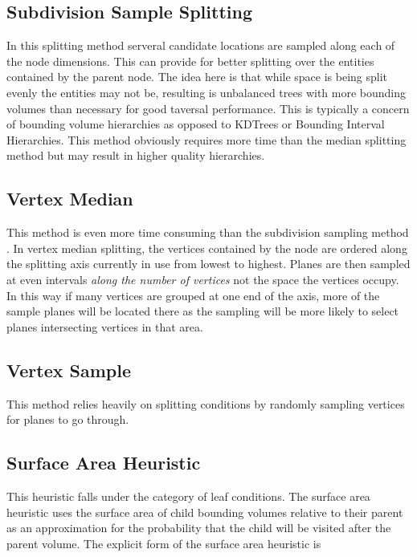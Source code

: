 \documentclass[10pt, a4paper]{article}
\begin{document}
\subsection{Subdivision Sample Splitting}%

In this splitting method serveral candidate locations are sampled along each of the node dimensions. This can provide for better splitting over the entities contained by the parent node. The idea here is that while space is being split evenly the entities may not be, resulting is unbalanced trees with more bounding volumes than necessary for good taversal performance. This is typically a concern of bounding volume hierarchies as opposed to KDTrees or Bounding Interval Hierarchies. This method obviously requires more time than the median splitting method but may result in higher quality hierarchies.

\subsection{Vertex Median}%

This method is even more time consuming than the subdivision sampling method . In vertex median splitting, the vertices contained by the node are ordered along the splitting axis currently in use from lowest to highest. Planes are then sampled at even intervals \textit{along the number of vertices} not the space the vertices occupy. In this way if many vertices are grouped at one end of the axis, more of the sample planes will be located there as the sampling will be more likely to select planes intersecting vertices in that area. 

\subsection{Vertex Sample}%

This method relies heavily on splitting conditions by randomly sampling vertices for planes to go through. 

\subsection{Surface Area Heuristic}%

This heuristic falls under the category of leaf conditions. The surface area heuristic uses the surface area of child bounding volumes relative to their parent as an approximation for the probability that the child will be visited after the parent volume. The explicit form of the surface area heuristic is \cite{sah_paper}
\end{document}
